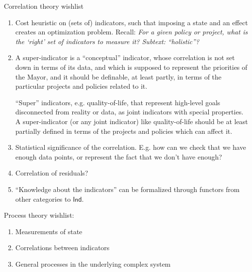 \documentclass{sig-alternate-05-2015}
\theoremstyle{plain}
\theoremstyle{plain}
\theoremstyle{remark}
\newcommand{\Cat}[1]{\mathsf{#1}}
\def\Ind{\Cat{Ind}}
\begin{document}
Correlation theory wishlist
\begin{enumerate}
\item Cost heuristic on (sets of) indicators, such that imposing a state and an effect creates an optimization problem. Recall: \emph{For a given policy or project, what is the `right' set of indicators to measure it? Subtext: ``holistic''?} %
\item A super-indicator is a ``conceptual'' indicator, whose correlation  is not set down in terms of its data, and which is supposed to represent the priorities of the Mayor, and it should be definable, at least partly, in terms of the particular projects and policies related to it.

``Super'' indicators, e.g. quality-of-life, that represent high-level goals disconnected from reality or data, as joint indicators with special properties. A super-indicator (or any joint indicator) like quality-of-life should be at least partially defined in terms of the projects and policies which can affect it. %
\item Statistical significance of the correlation. E.g. how can we check that we have enough data points, or represent the fact that we don't have enough? %
\item Correlation of residuals? %
\item ``Knowledge about the indicators'' can be formalized through functors from other categories to $\Ind$.
\end{enumerate}

Process theory wishlist:
\begin{enumerate}
\item Measurements of state %
\item Correlations between indicators
\item General processes in the underlying complex system
\end{enumerate}
\end{document}
